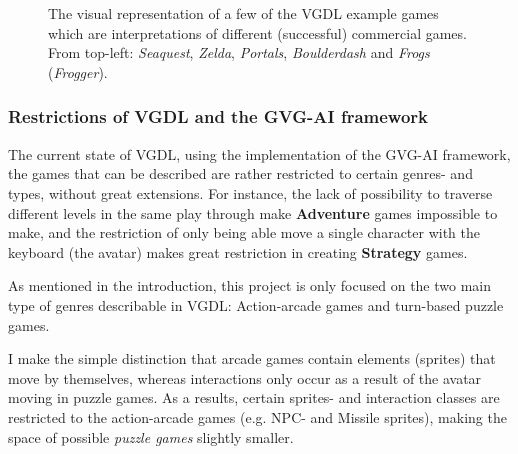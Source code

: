\documentclass[a4paper,titlepage,final]{report}
\begin{document}
\begin{figure}[!ht]
{    	}\\
	\\
    	\caption{The visual representation of a few of the VGDL example games which are interpretations of different (successful) commercial games. From top-left: \textit{Seaquest}, \emph{Zelda}, \emph{Portals}, \emph{Boulderdash} and \textit{Frogs} (\textit{Frogger}).}
	\label{fig:dummy}
\end{figure}





\subsubsection*{Restrictions of VGDL and the GVG-AI framework}
\label{ssec_gamegenres}
The current state of VGDL, using the implementation of the GVG-AI framework, the games that can be described are rather restricted to certain genres- and types, without great extensions.
For instance, the lack of possibility to traverse different levels in the same play through make \textbf{Adventure} games impossible to make, and the restriction of only being able move a single character with the keyboard (the avatar) makes great restriction in creating \textbf{Strategy} games.

As mentioned in the introduction, this project is only focused on the two main type of genres describable in VGDL: Action-arcade games and turn-based puzzle games. 

I make the simple distinction that arcade games contain elements (sprites) that move by themselves, whereas interactions only occur as a result of the avatar moving in puzzle games.
As a results, certain sprites- and interaction classes are restricted to the action-arcade games (e.g. NPC- and Missile sprites), making the space of possible \textit{puzzle games} slightly smaller.



\end{document}
